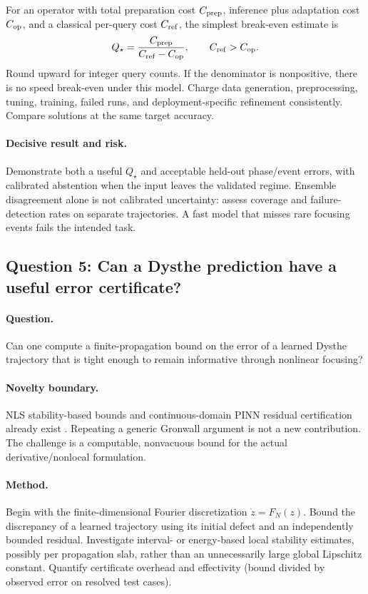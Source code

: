 For an operator with total preparation cost $C_{\rm prep}$, inference plus
adaptation cost $C_{\rm op}$, and a classical per-query cost $C_{\rm ref}$,
the simplest break-even estimate is
\[
 Q_\star=\frac{C_{\rm prep}}{C_{\rm ref}-C_{\rm op}},
 \qquad C_{\rm ref}>C_{\rm op}.
\]
Round upward for integer query counts. If the denominator is nonpositive,
there is no speed break-even under this model. Charge data generation,
preprocessing, tuning, training, failed runs, and deployment-specific
refinement consistently. Compare solutions at the same target accuracy.

\paragraph{Decisive result and risk.}
Demonstrate both a useful $Q_\star$ and acceptable held-out phase/event
errors, with calibrated abstention when the input leaves the validated
regime. Ensemble disagreement alone is not calibrated uncertainty:
assess coverage and failure-detection rates on separate trajectories.
A fast model that misses rare focusing events fails the intended task.

\subsection{Question 5: Can a Dysthe prediction have a useful error certificate?}
\paragraph{Question.}
Can one compute a finite-propagation bound on the error of a learned
Dysthe trajectory that is tight enough to remain informative through
nonlinear focusing?

\paragraph{Novelty boundary.}
NLS stability-based bounds and continuous-domain PINN residual
certification already exist \cite{alejo,eiras}. Repeating a generic
Gronwall argument is not a new contribution. The challenge is a computable,
nonvacuous bound for the actual derivative/nonlocal formulation.

\paragraph{Method.}
Begin with the finite-dimensional Fourier discretization
$\dot z=F_N(z)$. Bound the discrepancy of a learned trajectory using its
initial defect and an independently bounded residual. Investigate
interval- or energy-based local stability estimates, possibly per
propagation slab, rather than an unnecessarily large global Lipschitz
constant. Quantify certificate overhead and effectivity
(bound divided by observed error on resolved test cases).

